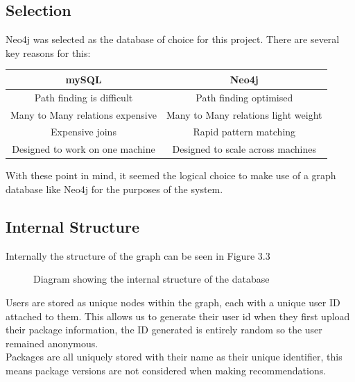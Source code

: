 \documentclass{l4proj}
\begin{document}
\subsection{Selection}
Neo4j was selected as the database of choice for this project. There are several key reasons for this:
\begin{center}
\begin{tabular}{|c|c|}
\hline
\textbf{mySQL} & \textbf{Neo4j}\\
\hline
Path finding is difficult & Path finding optimised\\
\hline
Many to Many relations expensive & Many to Many relations light weight\\
\hline
Expensive joins & Rapid pattern matching\\
\hline
Designed to work on one machine & Designed to scale across machines\\
\hline
\end{tabular}
\end{center}
With these point in mind, it seemed the logical choice to make use of a graph database like Neo4j for the purposes of the system.

\subsection{Internal Structure}
Internally the structure of the graph can be seen in Figure 3.3
\begin{figure}
\caption{Diagram showing the internal structure of the database}
\end{figure} 
Users are stored as unique nodes within the graph, each with a unique user ID attached to them. This allows us to generate their user id when they first upload their package information, the ID generated is entirely random so the user remained anonymous.\\
Packages are all uniquely stored with their name as their unique identifier, this means package versions are not considered when making recommendations.\\
\end{document}
